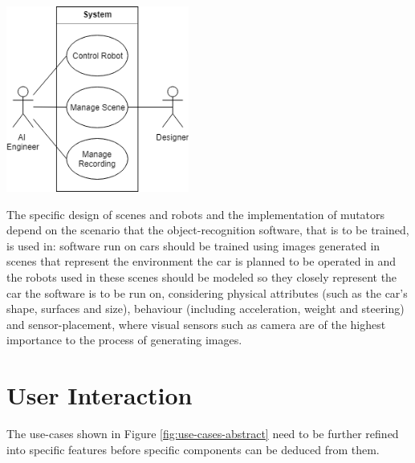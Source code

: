 \begin{center}
\noindent\includegraphics[width=6cm]{tex/img/ch04/UseCases_HighLevel_01.png}
\label{fig:use-cases-abstract}
\end{center}

The specific design of scenes and robots and the implementation of mutators depend on the scenario that the object-recognition software, that is to be trained, is used in: software run on cars should be trained using images generated in scenes that represent the environment the car is planned to be operated in and the robots used in these scenes should be modeled so they closely represent the car the software is to be run on, considering physical attributes (such as the car's shape, surfaces and size), behaviour (including acceleration, weight and steering)  and sensor-placement, where visual sensors such as camera are of the highest importance to the process of generating images.


\section{User Interaction}
The use-cases shown in Figure \ref{fig:use-cases-abstract} need to be further refined into specific features before specific components can be deduced from them.

